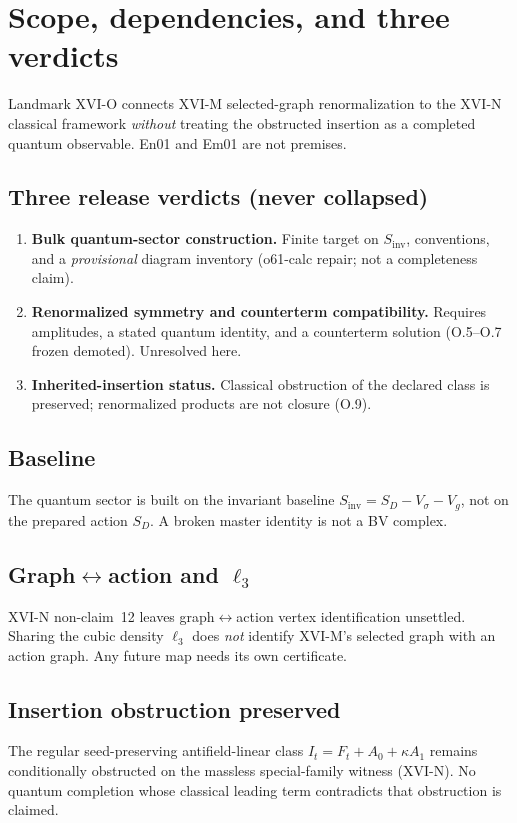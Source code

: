 \section{Scope, dependencies, and three verdicts}
\label{sec:O-scope}

Landmark XVI-O connects XVI-M selected-graph renormalization to the XVI-N classical
framework \emph{without} treating the obstructed insertion as a completed quantum
observable. En01 and Em01 are not premises.

\subsection{Three release verdicts (never collapsed)}
\begin{enumerate}
\item \textbf{Bulk quantum-sector construction.} Finite target on $S_{\mathrm{inv}}$,
conventions, and a \emph{provisional} diagram inventory (o61-calc repair; not a completeness claim).
\item \textbf{Renormalized symmetry and counterterm compatibility.} Requires amplitudes,
a stated quantum identity, and a counterterm solution (O.5--O.7 frozen demoted). Unresolved here.
\item \textbf{Inherited-insertion status.} Classical obstruction of the declared class
is preserved; renormalized products are not closure (O.9).
\end{enumerate}

\subsection{Baseline}
The quantum sector is built on the invariant baseline $S_{\mathrm{inv}}=S_D-V_\sigma-V_g$,
not on the prepared action $S_D$. A broken master identity is not a BV complex.

\subsection{Graph$\leftrightarrow$action and $\ell_3$}
XVI-N non-claim~12 leaves graph$\leftrightarrow$action vertex identification unsettled.
Sharing the cubic density $\ell_3$ does \emph{not} identify XVI-M's selected graph with
an action graph. Any future map needs its own certificate.

\subsection{Insertion obstruction preserved}
The regular seed-preserving antifield-linear class $I_t=F_t+A_0+\kappa A_1$ remains
conditionally obstructed on the massless special-family witness (XVI-N). No quantum
completion whose classical leading term contradicts that obstruction is claimed.


